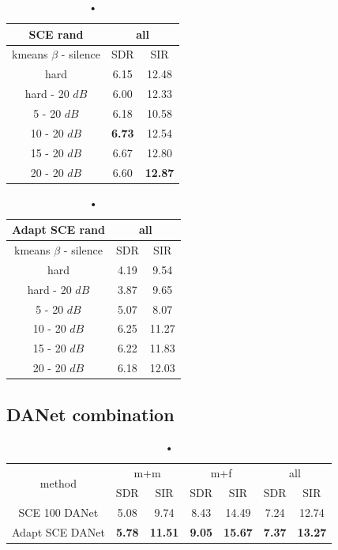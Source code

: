 \documentclass[master, tikz, final,11pt, dvipdfmx]{iscs-thesis}
\begin{document}
\begin{table}
\begin{subtable}{.5\linewidth}
\centering
\begin{tabular}{c|c|c}
SCE rand & \multicolumn{2}{c}{all} \\  
\hline 
kmeans $\beta$ - silence & SDR & SIR  \\ 
\hline
hard  & 6.15 & 12.48  \\ 
hard - 20 $dB$  & 6.00 & 12.33 \\
\hline
\hline
5 - 20 $dB$  & 6.18 & 10.58 \\ 
10 - 20 $dB$  & \cellcolor{green}\textbf{6.73} & \cellcolor{green}12.54 \\ 
15 - 20 $dB$ & 6.67 & 12.80  \\ 
20 - 20 $dB$ & 6.60 & \textbf{12.87}  \\ 
\end{tabular}
\caption{•}
\label{table:SCE100NSbest}
\end{subtable}%
\begin{subtable}{.5\linewidth}
\centering
\begin{tabular}{c|c|c}
Adapt SCE rand & \multicolumn{2}{c}{all} \\  
\hline 
kmeans $\beta$ - silence & SDR & SIR  \\ 
\hline
hard  & 4.19 & 9.54  \\ 
hard - 20 $dB$  & 3.87 & 9.65 \\
\hline
\hline
5 - 20 $dB$  & 5.07 & 8.07 \\ 
10 - 20 $dB$  & 6.25 & 11.27 \\ 
15 - 20 $dB$ & 6.22 & 11.83  \\ 
20 - 20 $dB$ & 6.18 & 12.03  \\ 
\end{tabular}
\caption{•}
\end{subtable}
\caption{•}
\end{table}


\subsection{DANet combination}
\label{DANET}

\begin{table}[h]
\centering
\begin{tabular}{c|c|c|c|c|c|c}
 \multirow{2}{*}{method}   & \multicolumn{2}{c|}{m+m} & \multicolumn{2}{c|}{m+f} & \multicolumn{2}{c}{all} \\ 
\cline{2-7}
 & SDR & SIR & SDR & SIR & SDR & SIR \\ 
\hline 
SCE 100 DANet & 5.08 & 9.74 & 8.43 & 14.49 & 7.24 & 12.74 \\ 
Adapt SCE DANet & \textbf{5.78} & \textbf{11.51} & \textbf{9.05} & \textbf{15.67} & \textbf{7.37} & \textbf{13.27} \\  
\end{tabular}
\captionsetup{justification=centering}
\caption{•}
\label{table:SCE100DANETrecap}
\end{table}
\end{document}
